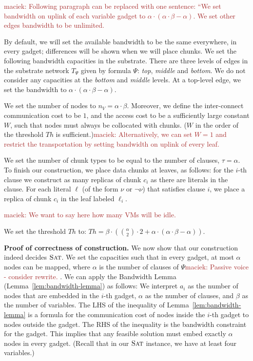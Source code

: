\documentclass[9pt]{sigcomm-alternate}
\newcommand{\maciek}[1]{\textcolor{brown}{maciek: #1}}
\newcommand{\variab}{\nu}
\newcommand{\clauses}{\alpha}
\newcommand{\variables}{\beta}
\newcommand{\achunk}{\ensuremath{c}}
\newcommand{\Tree}{\ensuremath{T}}
\newcommand{\Vms}{\ensuremath{n_V}}
\newcommand{\SAT}{\textsc{Sat}}
\newcommand{\Formula}{\ensuremath{\Psi}}
\newcommand{\Thr}{\ensuremath{Th}}
\begin{document}
\begin{appendix}
\maciek{Following paragraph can be replaced with one sentence: ``We set bandwidth on uplink of each variable gadget to $\clauses \cdot (\clauses
\cdot \variables -
\clauses)$. We set other edges bandwidth to be unlimited.}

By default, we will set the available
bandwidth to be the
same everywhere, in every gadget; differences will be shown when we
will place chunks.
We set the following bandwidth capacities in the substrate. There are three
levels of edges in the substrate network $\Tree_{\Formula}$ given by formula
$\Formula$: \emph{top}, \emph{middle} and \emph{bottom}.
We do not consider any capacities at the \emph{bottom} and \emph{middle} levels.
At a top-level edge, we set the bandwidth to $\clauses \cdot (\clauses
\cdot \variables -
\clauses)$.



We set the number of nodes to $\Vms = \clauses \cdot \variables$.
Moreover, we define the inter-connect communication cost to be $1$,
and the access cost to be a sufficiently large constant $W$,
such that nodes must always be collocated with chunks. ($W$ in the order of
the threshold $\Thr$ is sufficient.)\maciek{Alternatively, we can set $W=1$ and restrict the transportation by setting bandwidth on uplink of every leaf.}


We set the number of chunk types to be equal to the number of clauses, $\tau =
\clauses$. To finish our construction, we place data chunks at
leaves, as follows: for the $i$-th clause we
construct as many replicas of chunk $\achunk_i$ as there are literals in the
clause. For each literal $\ell$ (of the form $\variab$ or $\neg \variab$) that satisfies clause $i$,
 we place
a replica of chunk $\achunk_i$ in the leaf labeled $\ell_i$.

\maciek{We want to say here how many VMs will be idle.}

We set the threshold $\Thr$ to:
$ \Thr = \variables \cdot ({\clauses  \choose 2} \cdot 2 +
\clauses \cdot (\clauses
\cdot \variables - \clauses))$.

\textbf{Proof of correctness of construction.}
We now show that our construction indeed
decides $\SAT$. We set the capacities such that in every gadget,
at most $\clauses$ nodes can be mapped, where $\clauses$
is the number of clauses of $\Formula$\maciek{Passive voice - consider rewrite.}
.
We can apply the Bandwidth Lemma (Lemma~\ref{lem:bandwidth-lemma}) as follows:
We interpret $a_i$ as the
number of nodes that are embedded in the $i$-th gadget, $\clauses$
as the number
of clauses, and $\variables$ as the number of variables.
The LHS of the inequality of Lemma~\ref{lem:bandwidth-lemma}
is a formula for the communication cost of nodes inside the $i$-th
gadget to nodes outside the gadget. The RHS of the inequality is the
bandwidth constraint for the gadget. This implies that
any feasible solution must embed exactly $\clauses$ nodes in every gadget.
(Recall that in our $\SAT$ instance, we have at least four variables.)


\end{appendix}
\end{document}
